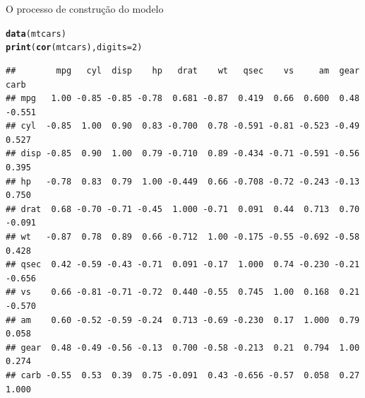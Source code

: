 \documentclass{beamer}\usepackage[]{graphicx}\usepackage[]{color}
\makeatletter
\newcommand{\hlnum}[1]{\textcolor[rgb]{0.686,0.059,0.569}{#1}}%
\newcommand{\hlstd}[1]{\textcolor[rgb]{0.345,0.345,0.345}{#1}}%
\newcommand{\hlkwc}[1]{\textcolor[rgb]{0.333,0.667,0.333}{#1}}%
\newcommand{\hlkwd}[1]{\textcolor[rgb]{0.737,0.353,0.396}{\textbf{#1}}}%
\newenvironment{kframe}{%
 \def\at@end@of@kframe{}%
 \ifinner\ifhmode%
  \def\at@end@of@kframe{\end{minipage}}%
  \begin{minipage}{\columnwidth}%
 \fi\fi%
 \def\FrameCommand##1{\hskip\@totalleftmargin \hskip-\fboxsep
 \colorbox{shadecolor}{##1}\hskip-\fboxsep
     \hskip-\linewidth \hskip-\@totalleftmargin \hskip\columnwidth}%
 \MakeFramed {\advance\hsize-\width
   \@totalleftmargin\z@ \linewidth\hsize
   \@setminipage}}%
 {\par\unskip\endMakeFramed%
 \at@end@of@kframe}
\newenvironment{knitrout}{}{} %
\renewenvironment{knitrout}{\setlength{\topsep}{0mm}}{}
\makeatother
\begin{document}
\begin{frame}[fragile]{O processo de construção do modelo}

\begin{knitrout}\tiny
{}\color{fgcolor}\begin{kframe}
\begin{alltt}
\hlkwd{data}\hlstd{(mtcars)}
\hlkwd{print}\hlstd{(}\hlkwd{cor}\hlstd{(mtcars),}\hlkwc{digits}\hlstd{=}\hlnum{2}\hlstd{)}
\end{alltt}
\begin{verbatim}
##        mpg   cyl  disp    hp   drat    wt   qsec    vs     am  gear   carb
## mpg   1.00 -0.85 -0.85 -0.78  0.681 -0.87  0.419  0.66  0.600  0.48 -0.551
## cyl  -0.85  1.00  0.90  0.83 -0.700  0.78 -0.591 -0.81 -0.523 -0.49  0.527
## disp -0.85  0.90  1.00  0.79 -0.710  0.89 -0.434 -0.71 -0.591 -0.56  0.395
## hp   -0.78  0.83  0.79  1.00 -0.449  0.66 -0.708 -0.72 -0.243 -0.13  0.750
## drat  0.68 -0.70 -0.71 -0.45  1.000 -0.71  0.091  0.44  0.713  0.70 -0.091
## wt   -0.87  0.78  0.89  0.66 -0.712  1.00 -0.175 -0.55 -0.692 -0.58  0.428
## qsec  0.42 -0.59 -0.43 -0.71  0.091 -0.17  1.000  0.74 -0.230 -0.21 -0.656
## vs    0.66 -0.81 -0.71 -0.72  0.440 -0.55  0.745  1.00  0.168  0.21 -0.570
## am    0.60 -0.52 -0.59 -0.24  0.713 -0.69 -0.230  0.17  1.000  0.79  0.058
## gear  0.48 -0.49 -0.56 -0.13  0.700 -0.58 -0.213  0.21  0.794  1.00  0.274
## carb -0.55  0.53  0.39  0.75 -0.091  0.43 -0.656 -0.57  0.058  0.27  1.000
\end{verbatim}
\end{kframe}
\end{knitrout}

\end{frame}
\end{document}
